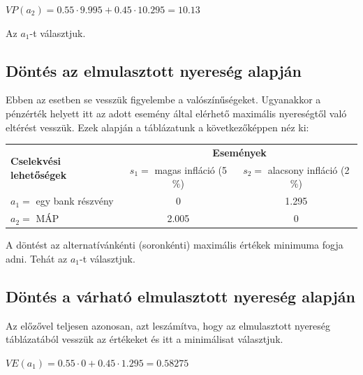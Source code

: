 \documentclass[a4paper,12pt]{article}
\begin{document}
$VP(a_2) = 0.55\cdot 9.995 + 0.45\cdot 10.295 = 10.13$

Az $a_1$-t választjuk.

\subsection{Döntés az elmulasztott nyereség alapján}
\label{susec:elmunyer}
Ebben az esetben se vesszük figyelembe a valószínűségeket. Ugyanakkor a pénzérték helyett itt az adott esemény által elérhető maximális nyereségtől való eltérést vesszük. Ezek alapján a táblázatunk a következőképpen néz ki:


\begin{center}
\begin{tabular}{l|c|c}
\multirow{2}{*}{\bf Cselekvési lehetőségek } &  \multicolumn{2}{c}{ \bf Események }\\
 & $s_1=$ magas infláció (5$\%$) & $s_2=$ alacsony infláció (2$\%$) \\
\hline
  $a_1=$ egy bank részvény & 0 & 1.295 \\
  $a_2=$ MÁP & 2.005 & 0 \\
\end{tabular}
\end{center}

A döntést az alternatívánkénti (soronkénti) maximális értékek minimuma fogja adni. Tehát az $a_1$-t választjuk.

\subsection{Döntés a várható elmulasztott nyereség alapján}
Az előzővel teljesen azonosan, azt leszámítva, hogy az elmulasztott nyereség táblázatából vesszük az értékeket és itt a minimálisat választjuk.

$VE(a_1) = 0.55\cdot 0 + 0.45\cdot 1.295 = 0.58275$
\end{document}

